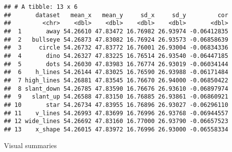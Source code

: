 \documentclass[]{book}
\newenvironment{Shaded}{\begin{snugshade}}{\end{snugshade}}
\newcommand{\KeywordTok}[1]{\textcolor[rgb]{0.13,0.29,0.53}{\textbf{{#1}}}}
\newcommand{\DataTypeTok}[1]{\textcolor[rgb]{0.13,0.29,0.53}{{#1}}}
\newcommand{\DecValTok}[1]{\textcolor[rgb]{0.00,0.00,0.81}{{#1}}}
\newcommand{\StringTok}[1]{\textcolor[rgb]{0.31,0.60,0.02}{{#1}}}
\newcommand{\NormalTok}[1]{{#1}}
\theoremstyle{definition}
\theoremstyle{definition}
\theoremstyle{remark}
\begin{document}
\begin{Shaded}
\end{Shaded}

\begin{verbatim}
## # A tibble: 13 x 6
##       dataset   mean_x   mean_y     sd_x     sd_y         cor
##         <chr>    <dbl>    <dbl>    <dbl>    <dbl>       <dbl>
##  1       away 54.26610 47.83472 16.76982 26.93974 -0.06412835
##  2   bullseye 54.26873 47.83082 16.76924 26.93573 -0.06858639
##  3     circle 54.26732 47.83772 16.76001 26.93004 -0.06834336
##  4       dino 54.26327 47.83225 16.76514 26.93540 -0.06447185
##  5       dots 54.26030 47.83983 16.76774 26.93019 -0.06034144
##  6    h_lines 54.26144 47.83025 16.76590 26.93988 -0.06171484
##  7 high_lines 54.26881 47.83545 16.76670 26.94000 -0.06850422
##  8 slant_down 54.26785 47.83590 16.76676 26.93610 -0.06897974
##  9   slant_up 54.26588 47.83150 16.76885 26.93861 -0.06860921
## 10       star 54.26734 47.83955 16.76896 26.93027 -0.06296110
## 11    v_lines 54.26993 47.83699 16.76996 26.93768 -0.06944557
## 12 wide_lines 54.26692 47.83160 16.77000 26.93790 -0.06657523
## 13    x_shape 54.26015 47.83972 16.76996 26.93000 -0.06558334
\end{verbatim}

Visual summaries

\begin{Shaded}
\end{Shaded}
\end{document}
